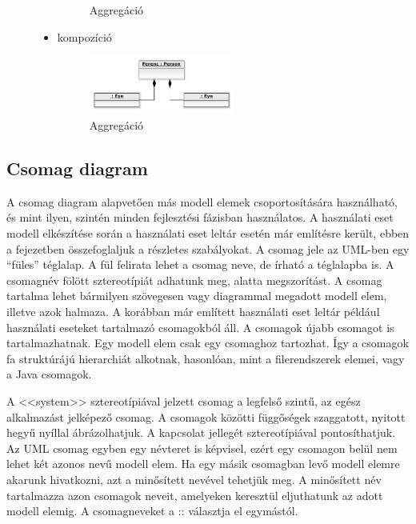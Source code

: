 \documentclass[margin=0px]{article}
\begin{document}
\begin{description}
\begin{itemize}
\begin{figure}[H]
                      \caption{Aggregáció}
                  \end{figure}
            \item kompozíció
                  \begin{figure}[H]
                      \centering
                      \includegraphics[width=0.5\textwidth]{img/kompozicio2.png}
                      \caption{Aggregáció}
                  \end{figure}
        \end{itemize}
\end{description}

\subsection{Csomag diagram}
A csomag diagram alapvetően más modell elemek csoportosítására használható, és mint ilyen, szintén minden fejlesztési fázisban használatos. A használati eset modell elkészítése során a használati eset leltár esetén már említésre került, ebben a fejezetben összefoglaljuk a részletes szabályokat. A csomag jele az UML-ben egy ``füles'' téglalap. A fül felirata lehet a csomag neve, de írható a téglalapba is. A csomagnév fölött sztereotípiát adhatunk meg, alatta megszorítást. A csomag tartalma lehet bármilyen szövegesen vagy diagrammal megadott modell elem, illetve azok halmaza. A korábban már említett használati eset leltár például használati eseteket tartalmazó csomagokból áll. A csomagok újabb csomagot is tartalmazhatnak. Egy modell elem csak egy csomaghoz tartozhat. Így a csomagok fa struktúrájú hierarchiát alkotnak, hasonlóan, mint a filerendszerek elemei, vagy a Java csomagok.

A <<system>> sztereotípiával jelzett csomag a legfelső szintű, az egész alkalmazást jelképező csomag. A csomagok közötti függőségek szaggatott,  nyitott hegyű nyíllal ábrázolhatjuk. A kapcsolat jellegét sztereotípiával pontosíthatjuk. Az UML csomag egyben egy névteret is képvisel, ezért egy csomagon belül nem lehet két azonos nevű modell elem. Ha egy másik csomagban levő modell elemre akarunk hivatkozni, azt a minősített nevével tehetjük meg. A minősített név tartalmazza azon csomagok neveit, amelyeken keresztül eljuthatunk az adott modell elemig. A csomagneveket a :: választja el egymástól.
\end{document}
